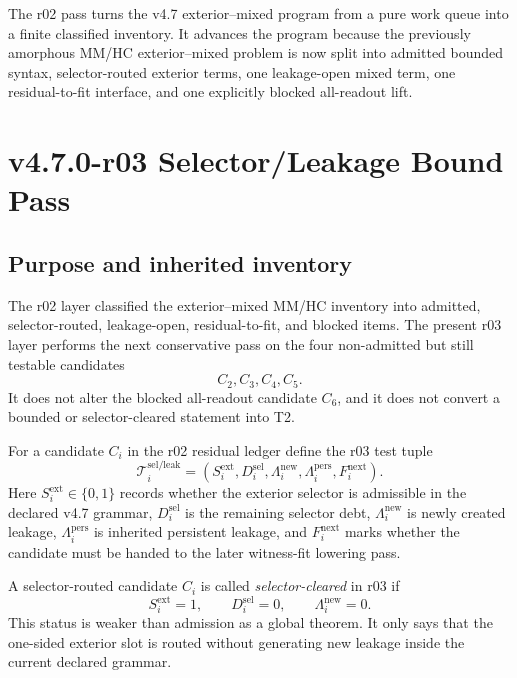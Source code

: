 \begin{remark}[r02 summary]
The r02 pass turns the v4.7 exterior--mixed program from a pure work queue into
a finite classified inventory.  It advances the program because the previously
amorphous MM/HC exterior--mixed problem is now split into admitted bounded
syntax, selector-routed exterior terms, one leakage-open mixed term, one
residual-to-fit interface, and one explicitly blocked all-readout lift.
\end{remark}


\clearpage
\section{v4.7.0-r03 Selector/Leakage Bound Pass}
\label{sec:v470-r03-selector-leakage-bound-pass}

\subsection{Purpose and inherited inventory}
\label{subsec:v470-r03-purpose-inventory}

The r02 layer classified the exterior--mixed MM/HC inventory into admitted,
selector-routed, leakage-open, residual-to-fit, and blocked items.  The present
r03 layer performs the next conservative pass on the four non-admitted but
still testable candidates
\[
C_2,
C_3,
C_4,
C_5.
\]
It does not alter the blocked all-readout candidate \(C_6\), and it does not
convert a bounded or selector-cleared statement into T2.

\begin{definition}
\label{def:v470-r03-selector-leakage-test-variables}
For a candidate \(C_i\) in the r02 residual ledger define the r03 test tuple
\[
\mathcal T^{\mathrm{sel/leak}}_{i}
=
\left(
S_i^{\mathrm{ext}},
D_i^{\mathrm{sel}},
\Lambda_i^{\mathrm{new}},
\Lambda_i^{\mathrm{pers}},
F_i^{\mathrm{next}}
\right).
\]
Here \(S_i^{\mathrm{ext}}\in\{0,1\}\) records whether the exterior selector is
admissible in the declared v4.7 grammar, \(D_i^{\mathrm{sel}}\) is the remaining
selector debt, \(\Lambda_i^{\mathrm{new}}\) is newly created leakage, \(\Lambda_i^{\mathrm{pers}}\)
is inherited persistent leakage, and \(F_i^{\mathrm{next}}\) marks whether the
candidate must be handed to the later witness-fit lowering pass.
\end{definition}

\begin{definition}
\label{def:v470-r03-admissible-selector-clearance}
A selector-routed candidate \(C_i\) is called \emph{selector-cleared} in r03 if
\[
S_i^{\mathrm{ext}}=1,
\qquad
D_i^{\mathrm{sel}}=0,
\qquad
\Lambda_i^{\mathrm{new}}=0.
\]
This status is weaker than admission as a global theorem.  It only says that the
one-sided exterior slot is routed without generating new leakage inside the
current declared grammar.
\end{definition}


